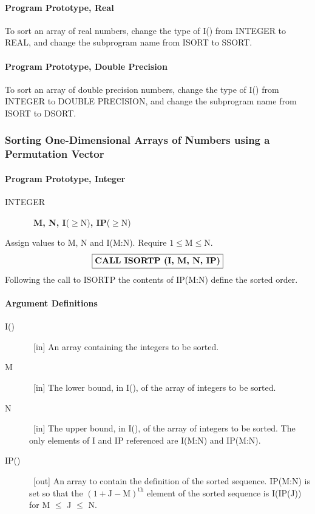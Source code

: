 \documentclass[twoside]{MATH77}
\begin{document}
\paragraph{Program Prototype, Real}

To sort an array of real numbers, change the type of I() from INTEGER to
REAL, and change the subprogram name from ISORT to SSORT.

\paragraph{Program Prototype, Double Precision}

To sort an array of double precision numbers, change the type of I() from
INTEGER to DOUBLE PRECISION, and change the subprogram name from ISORT to
DSORT.

\subsubsection{Sorting One-Dimensional Arrays of Numbers using a Permutation
Vector}

\paragraph{Program Prototype, Integer}

\begin{description}
\item[INTEGER]  \ {\bf M, N, I}($\geq $N){\bf , IP}($\geq $N)
\end{description}

Assign values to M, N and I(M:N). Require $1 \leq \text{M} \leq \text{N}.$
$$
\fbox{{\bf CALL ISORTP (I, M, N, IP)}}
$$
Following the call to ISORTP the contents of IP(M:N) define the
sorted order.

\paragraph{Argument Definitions}

\begin{description}
\item[I()]  \ [in] An array containing the integers to be sorted.

\item[M]  \ [in] The lower bound, in I(), of the array of integers to be
sorted.

\item[N]  \ [in] The upper bound, in I(), of the array of integers to be
sorted. The only elements of I and IP referenced are I(M:N) and IP(M:N).

\item[IP()]  \ [out] An array to contain the definition of the sorted
sequence. IP(M:N) is set so that the $(1+\text{J}-\text{M})^{\text{th}}$
element of the sorted sequence is I(IP(J)) for M $\leq $ J $\leq $ N.
\end{description}
\end{document}
